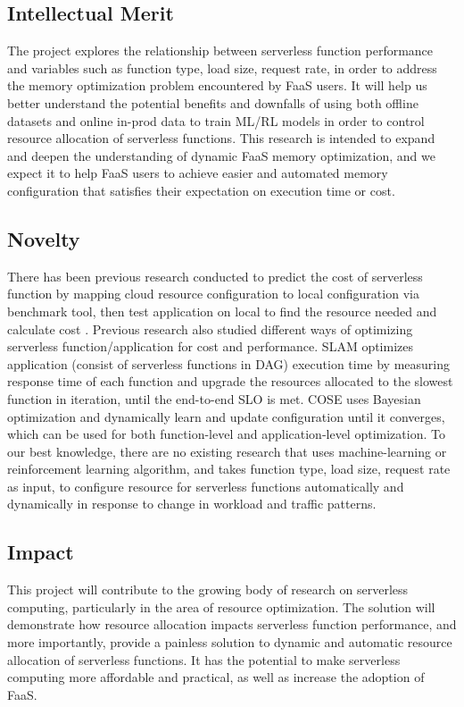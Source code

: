 \documentclass[conference]{IEEEtran}
\begin{document}
\subsection{Intellectual Merit}
The project explores the relationship between serverless function performance and variables such as function type, load size, request rate, in order to address the memory optimization problem encountered by FaaS users. It will help us better understand the potential benefits and downfalls of using both offline datasets and online in-prod data to train ML/RL models in order to control resource allocation of serverless functions. This research is intended to expand and deepen the understanding of dynamic FaaS memory optimization, and we expect it to help FaaS users to achieve easier and automated memory configuration that satisfies their expectation on execution time or cost.

\subsection{Novelty}
There has been previous research conducted to predict the cost of serverless function by mapping cloud resource configuration to local configuration via benchmark tool, then test application on local to find the resource needed and calculate cost \cite{9251165}. Previous research also studied different ways of optimizing serverless function/application for cost and performance. SLAM \cite{9860980} optimizes application (consist of serverless functions in DAG) execution time by measuring response time of each function and upgrade the resources allocated to the slowest function in iteration, until the end-to-end SLO is met. COSE \cite{10063937} uses Bayesian optimization and dynamically learn and update configuration until it converges, which can be used for both function-level and application-level optimization. To our best knowledge, there are no existing research that uses machine-learning or reinforcement learning algorithm, and takes function type, load size, request rate as input, to configure resource for serverless functions automatically and dynamically in response to change in workload and traffic patterns.

\subsection{Impact}
This project will contribute to the growing body of research on serverless computing, particularly in the area of resource optimization. The solution will demonstrate how resource allocation impacts serverless function performance, and more importantly, provide a painless solution to dynamic and automatic resource allocation of serverless functions. It has the potential to make serverless computing more affordable and practical, as well as increase the adoption of FaaS.
\end{document}
